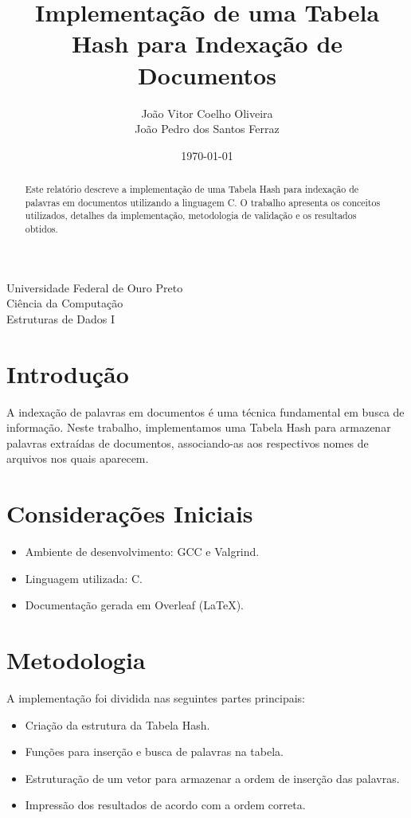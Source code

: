 \documentclass[a4paper,12pt]{article}
\title{Implementa\c{c}\~ao de uma Tabela Hash para Indexa\c{c}\~ao de Documentos}
\author{Jo\~ao Vitor Coelho Oliveira \\ Jo\~ao Pedro dos Santos Ferraz}
\date{\today}
\begin{document}
\maketitle

\begin{center}
    Universidade Federal de Ouro Preto\\
    Ci\^encia da Computa\c{c}\~ao\\
    Estruturas de Dados I
\end{center}

\begin{abstract}
    Este relat\'orio descreve a implementa\c{c}\~ao de uma Tabela Hash para indexa\c{c}\~ao de palavras em documentos utilizando a linguagem C. O trabalho apresenta os conceitos utilizados, detalhes da implementa\c{c}\~ao, metodologia de valida\c{c}\~ao e os resultados obtidos.
\end{abstract}

\section{Introdu\c{c}\~ao}
A indexa\c{c}\~ao de palavras em documentos \'e uma t\'ecnica fundamental em busca de informa\c{c}\~ao. Neste trabalho, implementamos uma Tabela Hash para armazenar palavras extra\'idas de documentos, associando-as aos respectivos nomes de arquivos nos quais aparecem.

\section{Considera\c{c}\~oes Iniciais}
\begin{itemize}
    \item Ambiente de desenvolvimento: GCC e Valgrind.
    \item Linguagem utilizada: C.
    \item Documenta\c{c}\~ao gerada em Overleaf (LaTeX).
\end{itemize}

\section{Metodologia}
A implementa\c{c}\~ao foi dividida nas seguintes partes principais:
\begin{itemize}
    \item Cria\c{c}\~ao da estrutura da Tabela Hash.
    \item Fun\c{c}\~oes para inser\c{c}\~ao e busca de palavras na tabela.
    \item Estrutura\c{c}\~ao de um vetor para armazenar a ordem de inser\c{c}\~ao das palavras.
    \item Impress\~ao dos resultados de acordo com a ordem correta.
\end{itemize}
\end{document}

